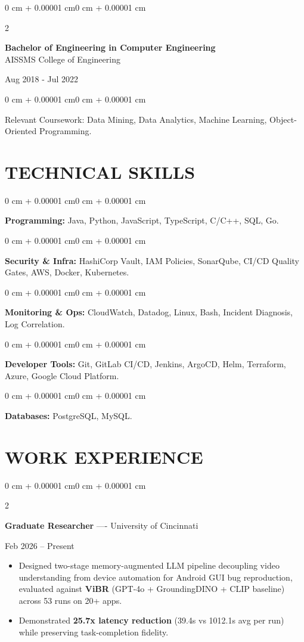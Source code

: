 \documentclass[10pt, letterpaper]{article}
\newenvironment{highlights}{
    \begin{itemize}[
        topsep=0.10 cm,
        parsep=0.06 cm,
        partopsep=0pt,
        itemsep=0.06 cm,
        leftmargin=12pt
    ]
}{
    \end{itemize}
}
\newenvironment{onecolentry}{
    \begin{adjustwidth}{0 cm + 0.00001 cm}{0 cm + 0.00001 cm}
}{
    \end{adjustwidth}
}
\newenvironment{twocolentry}[2][]{
    \onecolentry
    \def\secondColumn{#2}
    \setcolumnwidth{\fill, 4.5 cm}
    \begin{paracol}{2}
}{
    \switchcolumn \raggedleft \secondColumn
    \end{paracol}
    \endonecolentry
}
\begin{document}
\begin{twocolentry}{
    Aug 2018 - Jul 2022
}
    \textbf{Bachelor of Engineering in Computer Engineering} \\
    AISSMS College of Engineering
\end{twocolentry}
\begin{onecolentry}
Relevant Coursework: Data Mining, Data Analytics, Machine Learning, Object-Oriented Programming.
\end{onecolentry}
\section{TECHNICAL SKILLS}
\begin{onecolentry}
\textbf{Programming:} Java, Python, JavaScript, TypeScript, C/C++, SQL, Go.
\end{onecolentry}
\vspace{0.06 cm}
\begin{onecolentry}
\textbf{Security \& Infra:} HashiCorp Vault, IAM Policies, SonarQube, CI/CD Quality Gates, AWS, Docker, Kubernetes.
\end{onecolentry}
\vspace{0.06 cm}
\begin{onecolentry}
\textbf{Monitoring \& Ops:} CloudWatch, Datadog, Linux, Bash, Incident Diagnosis, Log Correlation.
\end{onecolentry}
\vspace{0.06 cm}
\begin{onecolentry}
\textbf{Developer Tools:} Git, GitLab CI/CD, Jenkins, ArgoCD, Helm, Terraform, Azure, Google Cloud Platform.
\end{onecolentry}
\vspace{0.06 cm}
\begin{onecolentry}
\textbf{Databases:} PostgreSQL, MySQL.
\end{onecolentry}

\section{WORK EXPERIENCE}
\begin{twocolentry}{Feb 2026 -- Present}
\textbf{Graduate Researcher} ---- University of Cincinnati
\end{twocolentry}
\begin{highlights}
  \item Designed two-stage memory-augmented LLM pipeline decoupling video understanding from device automation for Android GUI bug reproduction, evaluated against \textbf{ViBR} (GPT-4o + GroundingDINO + CLIP baseline) across 53 runs on 20+ apps.
  \item Demonstrated \textbf{25.7x latency reduction} (39.4s vs 1012.1s avg per run) while preserving task-completion fidelity.
\end{highlights}
\end{document}
